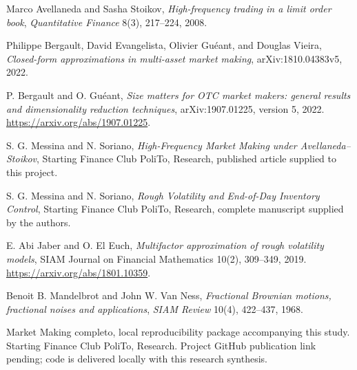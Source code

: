 \begin{references}
 Marco Avellaneda and Sasha Stoikov,
\emph{High-frequency trading in a limit order book},
\emph{Quantitative Finance} 8(3), 217--224, 2008.

 Philippe Bergault, David Evangelista, Olivier Gu\'eant, and Douglas Vieira,
\emph{Closed-form approximations in multi-asset market making},
arXiv:1810.04383v5, 2022.

 P. Bergault and O. Gu\'eant, \textit{Size matters for OTC market makers: general results and dimensionality reduction techniques}, arXiv:1907.01225, version 5, 2022. \url{https://arxiv.org/abs/1907.01225}.

 S. G. Messina and N. Soriano, \textit{High-Frequency Market Making under Avellaneda--Stoikov}, Starting Finance Club PoliTo, Research, published article supplied to this project.

 S. G. Messina and N. Soriano, \textit{Rough Volatility and End-of-Day Inventory Control}, Starting Finance Club PoliTo, Research, complete manuscript supplied by the authors.

 E. Abi Jaber and O. El Euch, \emph{Multifactor approximation of rough volatility models}, SIAM Journal on Financial Mathematics 10(2), 309--349, 2019. \url{https://arxiv.org/abs/1801.10359}.

 Benoit B. Mandelbrot and John W. Van Ness,
\emph{Fractional Brownian motions, fractional noises and applications},
\emph{SIAM Review} 10(4), 422--437, 1968.

 Market Making completo, local reproducibility package accompanying this study. Starting Finance Club PoliTo, Research. Project GitHub publication link pending; code is delivered locally with this research synthesis.

\end{references}
